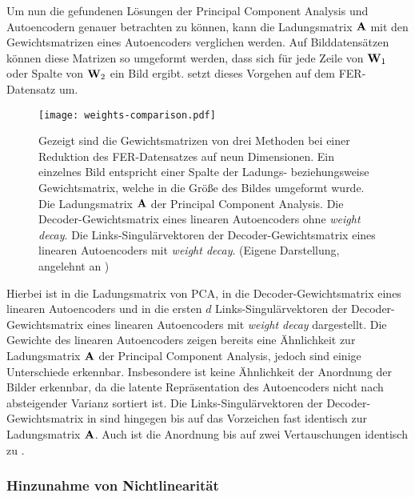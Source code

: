 Um nun die gefundenen Lösungen der Principal Component Analysis und Autoencodern genauer betrachten
zu können, kann die Ladungsmatrix $\mathbf{A}$ mit den Gewichtsmatrizen eines Autoencoders verglichen
werden. Auf Bilddatensätzen können diese Matrizen so umgeformt werden, dass sich für jede Zeile von
$\mathbf{W}_1$ oder Spalte von $\mathbf{W}_2$ ein Bild ergibt.  setzt
dieses Vorgehen auf dem FER-Datensatz um.
\begin{figure}[ht]
	\centering
	\texttt{[image: weights-comparison.pdf]}
	\caption[Die Gewichtsmatrizen von drei Methoden auf dem FER-Datensatz]{Gezeigt sind die Gewichtsmatrizen von drei Methoden bei einer Reduktion des FER-Datensatzes auf neun Dimensionen. Ein einzelnes Bild entspricht einer Spalte der Ladungs- beziehungsweise Gewichtsmatrix, welche in die Größe des Bildes umgeformt wurde. \captiona Die Ladungsmatrix $\mathbf{A}$ der Principal Component Analysis. \captionb Die Decoder-Gewichtsmatrix eines linearen Autoencoders ohne \textit{weight decay}. \captionc Die Links-Singulärvektoren der Decoder-Gewichtsmatrix eines linearen Autoencoders mit \textit{weight decay}. (Eigene Darstellung, angelehnt an \textcite[5]{Plaut.2018})}
	\label{fig:Gewichtsvergleich}
\end{figure}
Hierbei ist in  \captiona die Ladungsmatrix von PCA, in \captionb die Decoder-Gewichtsmatrix eines linearen Autoencoders und in \captionc die ersten $d$ Links-Singulärvektoren der Decoder-Gewichtsmatrix eines linearen Autoencoders mit \textit{weight decay} dargestellt.
Die Gewichte des linearen Autoencoders zeigen bereits eine Ähnlichkeit zur Ladungsmatrix $\mathbf{A}$ der Principal Component Analysis, jedoch sind einige Unterschiede erkennbar. Insbesondere ist keine Ähnlichkeit der Anordnung der Bilder erkennbar, da die latente Repräsentation des Autoencoders nicht nach absteigender Varianz sortiert ist. Die Links-Singulärvektoren der Decoder-Gewichtsmatrix in \captionc sind hingegen bis auf das Vorzeichen fast identisch zur Ladungsmatrix $\mathbf{A}$. Auch ist die Anordnung bis auf zwei Vertauschungen identisch zu \captiona.

\subsubsection{Hinzunahme von Nichtlinearität}

